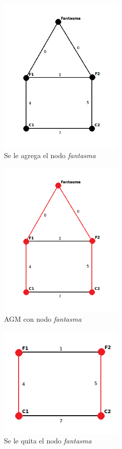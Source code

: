 \documentclass[a4paper, 10pt, twoside]{article}
\begin{document}
\begin{figure}[H]
\centering
\includegraphics[width=60mm]{../ejemplo_graficos/CosoDosSubconjuntosConNodoFantasma.png}
\caption{Se le agrega el nodo \textit{fantasma}}
\label{2}
\end{figure} 

\begin{figure}[H]
\centering
\includegraphics[width=60mm]{../ejemplo_graficos/CosoDosSubconjuntosConNodoFantasmaSolucion.png}
\caption{AGM con nodo \textit{fantasma}}
\label{3}
\end{figure} 

\begin{figure}[H]
\centering
\includegraphics[width=60mm]{../ejemplo_graficos/CosoDosSubconjuntosSolucion.png}
\caption{Se le quita el nodo \textit{fantasma}}
\label{4}
\end{figure} 
\end{document}
